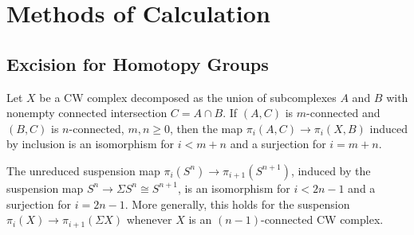 \section{Methods of Calculation}


\subsection{Excision for Homotopy Groups}

\begin{theorem}[]\label{Thm:Homotopy-Excision}
    Let $X$ be a CW complex decomposed as the union of
    subcomplexes $A$ and $B$ with nonempty connected
    intersection $C = A \cap B$. If
    $(A,C)$ is $m$-connected and
    $\left( B,C \right) $ is $n$-connected,
    $m,n \ge 0$, then the map
    $\pi_i (A,C) \to \pi_i (X,B)$ induced
    by inclusion is an isomorphism for
    $i < m+n$ and a surjection for
    $i = m+n$.
\end{theorem}

\begin{corollary}\label{Thm:Freudenthal-Suspension}
    The unreduced suspension map
    $\pi_i (S^{n}) \to 
    \pi_{i+1} \left( S^{n+1} \right) $, induced
    by the suspension map $S^{n} \to 
    \Sigma S^{n} \cong S^{n+1}$, is an
    isomorphism for
    $i < 2n-1$ and a surjection for
    $i = 2n-1$. More generally, this holds for
    the suspension
    $\pi_i (X) \to \pi_{i+1}\left( \Sigma X \right) $ whenever
    $X$ is an $(n-1)$-connected CW complex.
\end{corollary}

